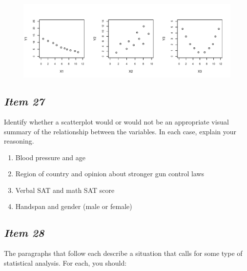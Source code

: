 \begin{figure}[ht]


\centering


\includegraphics[width=6.5in]{includes/Item19_R.pdf}


\end{figure}








\subsection{\textbf{\textit{Item 27}}}


Identify whether a scatterplot would or would not be an appropriate visual summary of the relationship between the variables. In each case, explain your reasoning. 


\begin{enumerate}[leftmargin=1cm, itemsep=.2em]


\item Blood pressure and age


\item Region of country and opinion about stronger gun control laws


\item Verbal SAT and math SAT score


\item Handspan and gender (male or female)


\end{enumerate}





\subsection{\textbf{\textit{Item 28}}}


The paragraphs that follow each describe a situation that calls for some type of statistical analysis. For each, you should:


